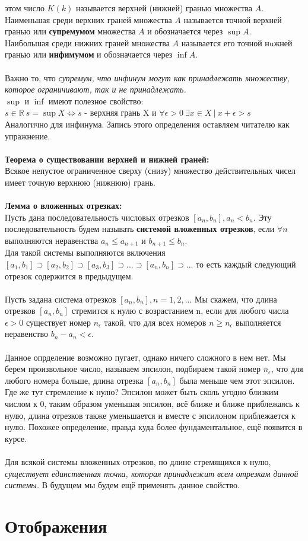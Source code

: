 \documentclass[a4paper]{article}
\begin{document}
этом число $K (k)$ называется верхней (нижней) гранью множества $A$.\\ Наименьшая
среди верхних граней множества $A$ называется точной верхней гранью или \textbf{супремумом} множества $A$ и обозначается через $\sup A$.\\Наибольшая среди нижних граней множества $A$ называется его точной нuжней гранью или \textbf{инфимумом} и обозначается через $\inf A$. \\\\Важно то, что \textit{супремум, что инфинум могут как принадлежать множеству, которое ограничивают, так и не принадлежать.}\\
$\sup$ и $\inf$ имеют полезное свойство:\\
$s \in \mathbb{R} \ s = \sup X \Leftrightarrow s$ - верхняя грань X и $\forall\epsilon > 0 \  \exists x \in X \  | \  x + \epsilon > s$\\
Аналогично для инфинума. Запись этого определения оставляем читателю как упражнение.
\\\\
\textbf{Теорема о существовании верхней и нижней граней:}\\
Всякое непустое ограниченное сверху (снизу) множество действительных чисел имеет точную верхнюю
(нижнюю) грань.
\\\\
\textbf{Лемма о вложенных отрезках:}\\
Пусть дана последовательность числовых отрезков ${[a_n, b_n]},
a_n < b_n$. Эту последовательность будем называть \textbf{системой вложенных отрезков}, если
$\forall n$ выполняются неравенства $a_n \leqslant a_{n+1}$ и $b_{n+1} \leqslant b_n$.\\
Для такой системы выполняются включения
$[a_1, b_1] \supset [a_2, b_2] \supset [a_3, b_3] \supset ... \supset [a_n, b_n] \supset ... $
то есть каждый следующий отрезок содержится в предыдущем. \\\\
Пусть задана система отрезков ${[a_n, b_n]}, n = 1, 2, ...$ Мы скажем, что длина отрезков $[a_n, b_n]$ стремится к нулю с возрастанием n, если для любого
числа $\epsilon > 0$ существует номер $n_\epsilon$ такой, что для всех номеров $n \geqslant n_\epsilon$ выполняется
неравенство $b_n - a_n < \epsilon$.\\\\Данное опрделение возможно пугает, однако ничего сложного в нем нет. Мы берем произвольное число, называем эпсилон, подбираем такой номер $n_\epsilon$, что для любого номера больше, длина отрезка $[a_n,b_n]$ была меньше чем этот эпсилон. Где же тут стремление к нулю? Эпсилон может быть сколь угодно близким числом к 0, таким образом уменьшая эпсилон, всё ближе и ближе приблежаясь к нулю, длина отрезков также уменьшается и вместе с эпсилоном приблежается к нулю. Похожее определение, правда куда более фундаментальное, ещё появится в курсе.\\\\
Для всякой системы вложенных отрезков, по длине стремящихся к
нулю, \textit{существует единственная точка, которая принадлежит всем отрезкам данной
системы.} В будущем мы будем ещё применять данное свойство. 
\section{Отображения}
\end{document}
